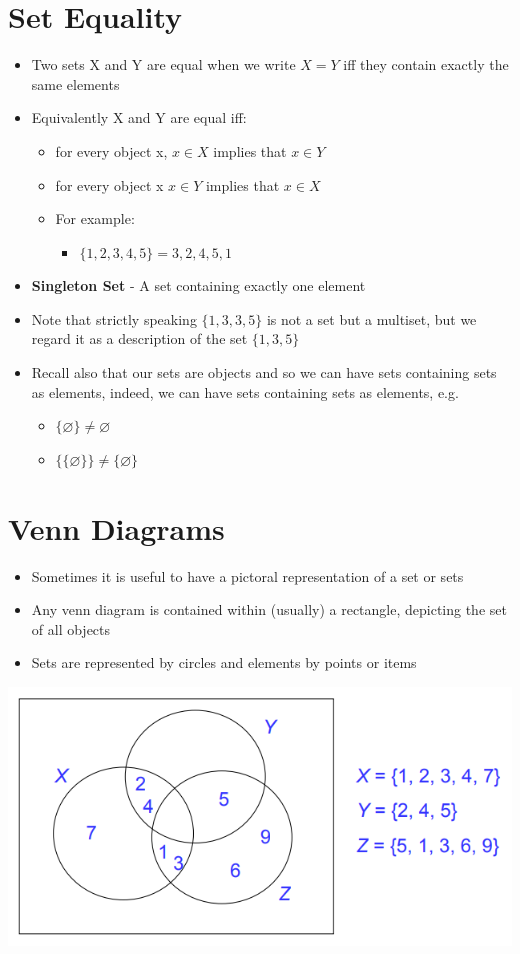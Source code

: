 \documentclass{article}[18pt]
\begin{document}
\section{Set Equality}
\begin{itemize}
	\item Two sets X and Y are equal when we write $X=Y$ iff they contain exactly the same elements
	\item Equivalently X and Y are equal iff:
	\begin{itemize}
		\item for every object x, $x\in X$ implies that $x\in Y$
		\item for every object x $x\in Y$ implies that $x\in X$
		\item For example:
		\begin{itemize}
			\item $\{1,2,3,4,5\}={3,2,4,5,1}$
		\end{itemize}
	\end{itemize}
	\item \textbf{Singleton Set} - A set containing exactly one element
	\item Note that strictly speaking $\{1,3,3,5\}$ is not a set but a multiset, but we regard it as a description of the set $\{1,3,5\}$
	\item Recall also that our sets are objects and so we can have sets containing sets as elements, indeed, we can have sets containing sets as elements, e.g.
	\begin{itemize}
		\item $\{\varnothing\}\neq \varnothing$
		\item $\{\{\varnothing\}\}\neq \{\varnothing\}$ 
	\end{itemize}
\end{itemize}
\section{Venn Diagrams}
\begin{itemize}
	\item Sometimes it is useful to have a pictoral representation of a set or sets
	\item Any venn diagram is contained within (usually) a rectangle, depicting the set of all objects
	\item Sets are represented by circles and elements by points or items
\end{itemize}
\begin{center}
	\includegraphics[scale=0.7]{venn}
\end{center}
\end{document}
